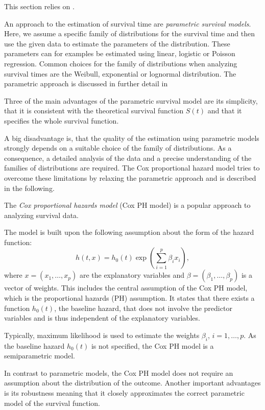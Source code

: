 \documentclass[12pt, a4paper]{scrartcl}
\theoremstyle{definition}
\theoremstyle{plain}
\numberwithin{equation}{section}
\numberwithin{figure}{section}
\numberwithin{table}{section}
\begin{document}
	This section relies on \citet*{sabook}.
	
	An approach to the estimation of survival time are \emph{parametric survival models}.
	Here, we assume a specific family of distributions for the survival time and then use the given data to estimate the parameters of the distribution.
	These parameters can for examples be estimated using linear, logistic or Poisson regression.
	Common choices for the family of distributions when analyzing survival times are the Weibull, exponential or lognormal distribution.
	The parametric approach is discussed in further detail in \citet*{sabook}
	
	Three of the main advantages of the parametric survival model are its simplicity,  that it is consistent with the theoretical survival function $S(t)$ and that it specifies the whole survival function.
	
	A big disadvantage is, that the quality of the estimation using parametric models strongly depends on a suitable choice of the family of distributions.
	As a consequence, a detailed analysis of the data and a precise understanding of the families of distributions are required.
	The Cox proportional hazard model tries to overcome these limitations by relaxing the parametric approach and is described in the following.
	
	The \emph{Cox proportional hazards model} (Cox PH model) is a popular approach to analyzing survival data.
	
	The model is built upon the following assumption about the form of the hazard function:
	\begin{equation*}
	h(t,x) = h_0(t) \exp \left(\sum_{i=1}^p \beta_i x_i\right),
	\end{equation*}
	where $x=(x_1,\dots,x_p)$ are the explanatory variables and $\beta = (\beta_1,\dots, \beta_p)$ is a vector of weights.
	This includes the central assumption of the Cox PH model, which is the proportional hazards (PH) assumption.
	It states that there exists a function $h_0(t)$, the baseline hazard, that does not involve the predictor variables and is thus independent of the explanatory variables.

	Typically, maximum likelihood is used to estimate the weights $\beta_i$, $i=1,\dots ,p$.
	As the baseline hazard $h_0(t)$ is not specified, the Cox PH model is a semiparametric model.
	
	In contrast to parametric models, the Cox PH model does not require an assumption about the distribution of the outcome.
	Another important advantages is its robustness meaning that it closely approximates the correct parametric model of the survival function.
	
\end{document}

